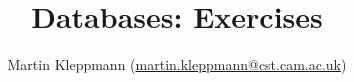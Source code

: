 \documentclass{article}
\begin{document}
\title{Databases: Exercises}
\author{Martin Kleppmann (\url{martin.kleppmann@cst.cam.ac.uk})}
\date{}
\maketitle


\end{document}
